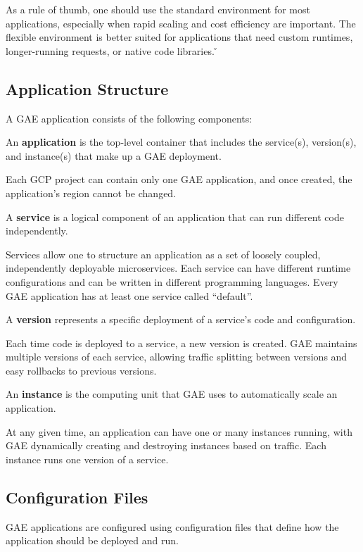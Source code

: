 As a rule of thumb, one should use the standard environment for most applications, especially when rapid scaling and
cost efficiency are important. The flexible environment is better suited for applications that need custom runtimes,
longer-running requests, or native code libraries. \v

\subsection{Application Structure}

A GAE application consists of the following components:

\bd[Application]
An \textbf{application} is the top-level container that includes the service(s), version(s), and instance(s) that
make up a GAE deployment.
\ed

Each GCP project can contain only one GAE application, and once created, the application's region cannot be changed.

\bd[Service]
A \textbf{service} is a logical component of an application that can run different code independently.
\ed

Services allow one to structure an application as a set of loosely coupled, independently deployable microservices.
Each service can have different runtime configurations and can be written in different programming languages. Every
GAE application has at least one service called ``default''.

\bd[Version]
A \textbf{version} represents a specific deployment of a service's code and configuration.
\ed

Each time code is deployed to a service, a new version is created. GAE maintains multiple versions of each service,
allowing traffic splitting between versions and easy rollbacks to previous versions.

\bd[Instance]
An \textbf{instance} is the computing unit that GAE uses to automatically scale an application.
\ed

At any given time, an application can have one or many instances running, with GAE dynamically creating and destroying
instances based on traffic. Each instance runs one version of a service.

\subsection{Configuration Files}

GAE applications are configured using configuration files that define how the application should be deployed and run.

